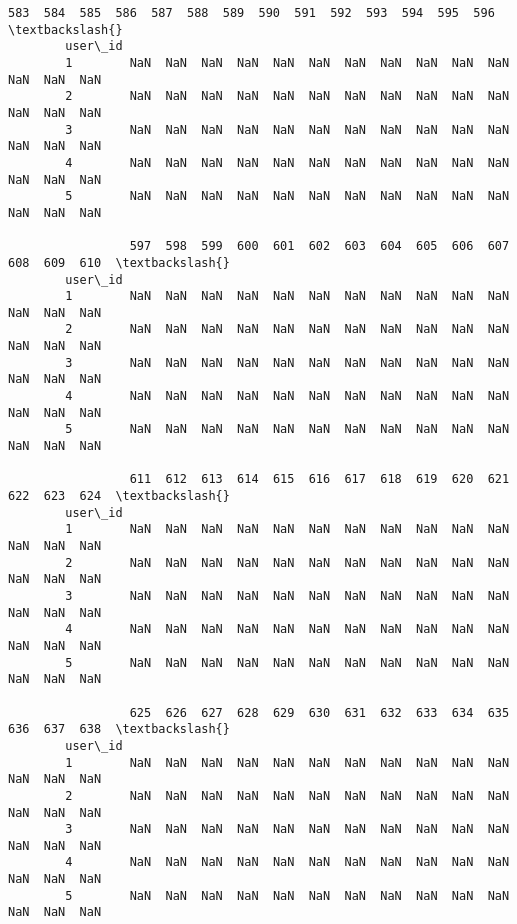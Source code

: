 \documentclass[11pt]{article}
\begin{document}
\begin{Verbatim}[commandchars=\\\{\}]
                 583  584  585  586  587  588  589  590  591  592  593  594  595  596  \textbackslash{}
        user\_id                                                                         
        1        NaN  NaN  NaN  NaN  NaN  NaN  NaN  NaN  NaN  NaN  NaN  NaN  NaN  NaN   
        2        NaN  NaN  NaN  NaN  NaN  NaN  NaN  NaN  NaN  NaN  NaN  NaN  NaN  NaN   
        3        NaN  NaN  NaN  NaN  NaN  NaN  NaN  NaN  NaN  NaN  NaN  NaN  NaN  NaN   
        4        NaN  NaN  NaN  NaN  NaN  NaN  NaN  NaN  NaN  NaN  NaN  NaN  NaN  NaN   
        5        NaN  NaN  NaN  NaN  NaN  NaN  NaN  NaN  NaN  NaN  NaN  NaN  NaN  NaN   
        
                 597  598  599  600  601  602  603  604  605  606  607  608  609  610  \textbackslash{}
        user\_id                                                                         
        1        NaN  NaN  NaN  NaN  NaN  NaN  NaN  NaN  NaN  NaN  NaN  NaN  NaN  NaN   
        2        NaN  NaN  NaN  NaN  NaN  NaN  NaN  NaN  NaN  NaN  NaN  NaN  NaN  NaN   
        3        NaN  NaN  NaN  NaN  NaN  NaN  NaN  NaN  NaN  NaN  NaN  NaN  NaN  NaN   
        4        NaN  NaN  NaN  NaN  NaN  NaN  NaN  NaN  NaN  NaN  NaN  NaN  NaN  NaN   
        5        NaN  NaN  NaN  NaN  NaN  NaN  NaN  NaN  NaN  NaN  NaN  NaN  NaN  NaN   
        
                 611  612  613  614  615  616  617  618  619  620  621  622  623  624  \textbackslash{}
        user\_id                                                                         
        1        NaN  NaN  NaN  NaN  NaN  NaN  NaN  NaN  NaN  NaN  NaN  NaN  NaN  NaN   
        2        NaN  NaN  NaN  NaN  NaN  NaN  NaN  NaN  NaN  NaN  NaN  NaN  NaN  NaN   
        3        NaN  NaN  NaN  NaN  NaN  NaN  NaN  NaN  NaN  NaN  NaN  NaN  NaN  NaN   
        4        NaN  NaN  NaN  NaN  NaN  NaN  NaN  NaN  NaN  NaN  NaN  NaN  NaN  NaN   
        5        NaN  NaN  NaN  NaN  NaN  NaN  NaN  NaN  NaN  NaN  NaN  NaN  NaN  NaN   
        
                 625  626  627  628  629  630  631  632  633  634  635  636  637  638  \textbackslash{}
        user\_id                                                                         
        1        NaN  NaN  NaN  NaN  NaN  NaN  NaN  NaN  NaN  NaN  NaN  NaN  NaN  NaN   
        2        NaN  NaN  NaN  NaN  NaN  NaN  NaN  NaN  NaN  NaN  NaN  NaN  NaN  NaN   
        3        NaN  NaN  NaN  NaN  NaN  NaN  NaN  NaN  NaN  NaN  NaN  NaN  NaN  NaN   
        4        NaN  NaN  NaN  NaN  NaN  NaN  NaN  NaN  NaN  NaN  NaN  NaN  NaN  NaN   
        5        NaN  NaN  NaN  NaN  NaN  NaN  NaN  NaN  NaN  NaN  NaN  NaN  NaN  NaN   
        

\end{Verbatim}
\end{document}
